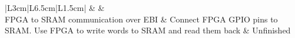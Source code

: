 \begin{tabular}{|L{3cm}|L{6.5cm}|L{1.5cm}|}
	 &
	 &
	 \\
\hline
	FPGA to SRAM communication over EBI &
	Connect FPGA GPIO pins to SRAM. Use FPGA to write words to SRAM and read them back &
	Unfinished \\
\hline
\end{tabular}

